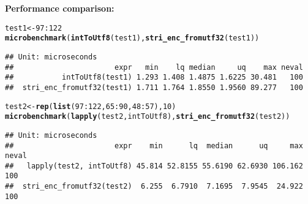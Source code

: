 \documentclass[11pt]{article}\usepackage[]{graphicx}\usepackage[]{color}
\makeatletter
\newcommand{\hlnum}[1]{\textcolor[rgb]{0.686,0.059,0.569}{#1}}%
\newcommand{\hlopt}[1]{\textcolor[rgb]{0,0,0}{#1}}%
\newcommand{\hlstd}[1]{\textcolor[rgb]{0.345,0.345,0.345}{#1}}%
\newcommand{\hlkwb}[1]{\textcolor[rgb]{0.69,0.353,0.396}{#1}}%
\newcommand{\hlkwd}[1]{\textcolor[rgb]{0.737,0.353,0.396}{\textbf{#1}}}%
\newenvironment{kframe}{%
 \def\at@end@of@kframe{}%
 \ifinner\ifhmode%
  \def\at@end@of@kframe{\end{minipage}}%
  \begin{minipage}{\columnwidth}%
 \fi\fi%
 \def\FrameCommand##1{\hskip\@totalleftmargin \hskip-\fboxsep
 \colorbox{shadecolor}{##1}\hskip-\fboxsep
     \hskip-\linewidth \hskip-\@totalleftmargin \hskip\columnwidth}%
 \MakeFramed {\advance\hsize-\width
   \@totalleftmargin\z@ \linewidth\hsize
   \@setminipage}}%
 {\par\unskip\endMakeFramed%
 \at@end@of@kframe}
\newenvironment{knitrout}{}{} %
\makeatother
\begin{document}
\bigskip
\noindent\textbf{Performance comparison:}

\begin{knitrout}\small
{}\color{fgcolor}\begin{kframe}
\begin{alltt}
\hlstd{test1} \hlkwb{<-} \hlnum{97}\hlopt{:}\hlnum{122}
\hlkwd{microbenchmark}\hlstd{(}\hlkwd{intToUtf8}\hlstd{(test1),} \hlkwd{stri_enc_fromutf32}\hlstd{(test1))}
\end{alltt}
\begin{verbatim}
## Unit: microseconds
##                       expr   min    lq median     uq    max neval
##           intToUtf8(test1) 1.293 1.408 1.4875 1.6225 30.481   100
##  stri_enc_fromutf32(test1) 1.711 1.764 1.8550 1.9560 89.277   100
\end{verbatim}
\begin{alltt}
\hlstd{test2} \hlkwb{<-} \hlkwd{rep}\hlstd{(}\hlkwd{list}\hlstd{(}\hlnum{97}\hlopt{:}\hlnum{122}\hlstd{,} \hlnum{65}\hlopt{:}\hlnum{90}\hlstd{,} \hlnum{48}\hlopt{:}\hlnum{57}\hlstd{),} \hlnum{10}\hlstd{)}
\hlkwd{microbenchmark}\hlstd{(}\hlkwd{lapply}\hlstd{(test2, intToUtf8),} \hlkwd{stri_enc_fromutf32}\hlstd{(test2))}
\end{alltt}
\begin{verbatim}
## Unit: microseconds
##                       expr    min      lq  median      uq     max neval
##   lapply(test2, intToUtf8) 45.814 52.8155 55.6190 62.6930 106.162   100
##  stri_enc_fromutf32(test2)  6.255  6.7910  7.1695  7.9545  24.922   100
\end{verbatim}
\end{kframe}
\end{knitrout}


\end{document}
